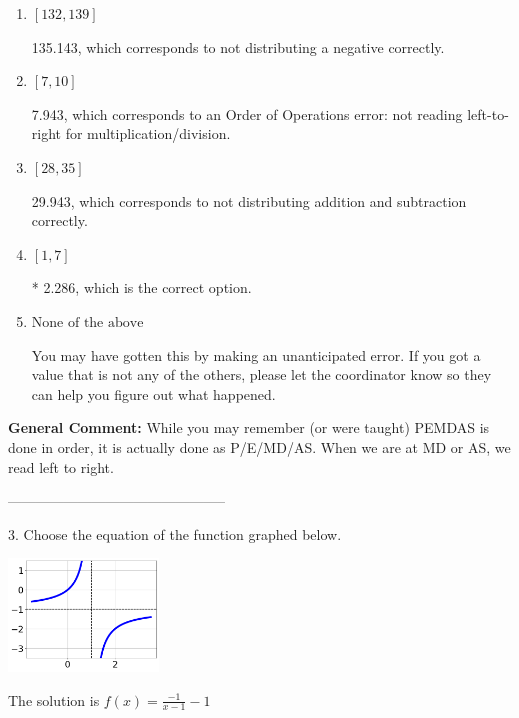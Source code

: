 \documentclass{extbook}[14pt]
\begin{document}
\begin{enumerate}[label=\Alph*.] 
\item $ [132, 139] $ 

  135.143, which corresponds to not distributing a negative correctly. 
\item $ [7, 10] $ 

  7.943, which corresponds to an Order of Operations error: not reading left-to-right for multiplication/division. 
\item $ [28, 35] $ 

  29.943, which corresponds to not distributing addition and subtraction correctly. 
\item $ [1, 7] $ 

 * 2.286, which is the correct option. 
\item $ \text{None of the above} $ 

  You may have gotten this by making an unanticipated error. If you got a value that is not any of the others, please let the coordinator know so they can help you figure out what happened. 
\end{enumerate} 
 
\textbf{General Comment:} While you may remember (or were taught) PEMDAS is done in order, it is actually done as P/E/MD/AS. When we are at MD or AS, we read left to right. 

-----------------------------------------------

3. Choose the equation of the function graphed below.
\begin{center} \includegraphics[width=0.3\textwidth]{../Figures/rationalGraphToEquationC.png} \end{center} 

The solution is $ f(x) = \frac{-1}{x - 1} - 1 $ 
\end{document}
